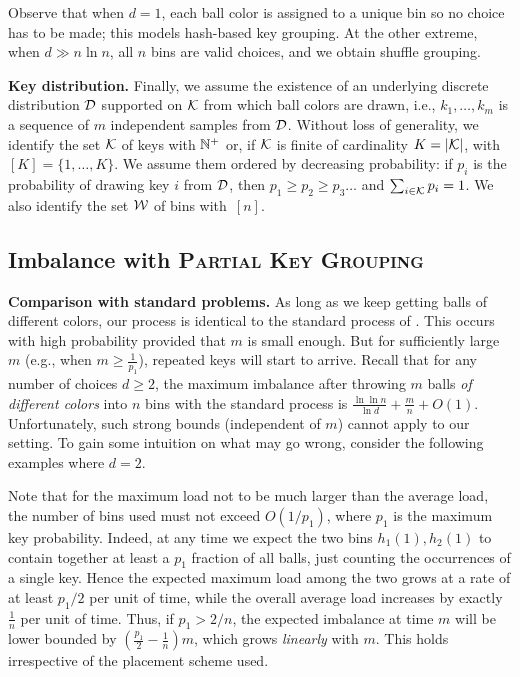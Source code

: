 \documentclass[10pt,conference,letterpaper]{IEEEtran}
\newcommand{\spara}[1]{\smallskip\noindent\textbf{#1}}
\newcommand{\pkg}{\textsc{Partial Key Grouping}\xspace}
\newcommand{\keysize}{K\xspace}
\begin{document}
Observe that when $d = 1$,
each ball color is assigned to a unique bin so no choice has to be made; this models hash-based key grouping.
At the other extreme, when $d \gg n \ln n$, all $n$  bins are valid choices, and we obtain shuffle
grouping.

\spara{Key distribution.}
Finally, we assume the existence of an underlying discrete distribution ${\mathcal D}$ supported on ${\mathcal{K}}$ from which ball colors
are drawn, i.e., $k_1, \ldots, k_m$ is a sequence of $m$ independent samples from ${\mathcal D}$. 
Without loss of generality, we identify the set ${\mathcal{K}}$ of keys with
${\mathbb N}^+$ or, if ${\mathcal{K}}$ is finite of cardinality $\keysize = |\calK|$, with $[\keysize] = \{1, \ldots, \keysize\}$.
We assume them ordered by decreasing probability: if $p_i$ is the probability of drawing key $i$ from ${\mathcal D}$, then
$p_1 \ge p_2 \ge p_3 \ldots$ and $\sum_{i \in {\ensuremath{\mathcal{K}}}} p_i = 1$. We also identify the set ${\mathcal{W}}$ of bins with~$[n]$.


\subsection{Imbalance with \pkg}

\spara{Comparison with standard problems.}
As long as we keep getting balls of different colors, our process is identical to the standard  process of \citet{azar1999balanced-allocations}.
This occurs with high probability provided that $m$ is small enough.
But for sufficiently large $m$ (e.g., when $m \ge \frac{1}{p_1}$), repeated keys will start to arrive.
Recall that for any number of choices $d\ge 2$, the maximum imbalance after throwing $m$ balls \emph{of different colors} into $n$ bins with the standard  process is $\frac{\ln \ln n}{\ln d} + \frac{m}{n} + O(1)$. Unfortunately, such strong bounds (independent of $m$) cannot apply to our setting.
To gain some intuition on what may go wrong, consider the following examples where $d$$=$$2$.

Note that for the maximum load not to be much larger than the average load, the number of bins used must not exceed $O(1/p_1)$, where $p_1$ is the maximum key probability.
Indeed, at any time we expect
the two bins $h_1(1), h_2(1)$ to contain together at
least a $p_1$ fraction of all balls, just counting the occurrences of a single key. Hence the expected maximum load among the two grows at a rate
of at least $p_1/2$ per unit of
time, while the overall average load increases by exactly $\frac{1}{n}$ per unit of time. Thus, if $p_1 > 2/ n$, the expected imbalance at time $m$ will be lower bounded by
$(\frac{p_1}2 - \frac1n) m$, which grows \emph{linearly} with $m$. This holds irrespective of the placement scheme used.
\end{document}
